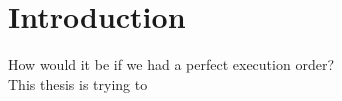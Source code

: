 \chapter{Introduction}\label{chap:introduction}

How would it be if we had a perfect execution order? \\
This thesis is trying to 
